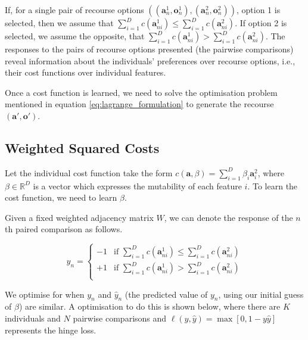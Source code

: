 If, for a single pair of recourse options $((\mathbf{a}_n^1, \mathbf{o}_n^1),(\mathbf{a}_n^2, \mathbf{o}_n^2))$, option 1 is selected, then we assume that $\sum_{i=1}^D c(\mathbf{a}^1_{ni}) \leq \sum_{i=1}^D c(\mathbf{a}^2_{ni})$. If option 2 is selected, we assume the opposite, that $\sum_{i=1}^D c(\mathbf{a}^1_{ni}) > \sum_{i=1}^D c(\mathbf{a}^2_{ni})$. The responses to the pairs of recourse options presented (the pairwise comparisons) reveal information about the individuals' preferences over recourse options, i.e., their cost functions over individual features. 

Once a cost function is learned, we need to solve the optimisation problem mentioned in equation \ref{eq:lagrange_formulation} to generate the recourse $(\mathbf{a}', \mathbf{o}')$.

\subsection{Weighted Squared Costs}

Let the individual cost function take the form $c(\mathbf{a}, \beta) = \sum_{i=1}^D \beta_i \mathbf{a}^2_i$, where $\beta \in \mathbb{R}^D$ is a vector which expresses the mutability of each feature $i$. To learn the cost function, we need to learn $\beta$.

Given a fixed weighted adjacency matrix $W$, we can denote the response of the $n$th paired comparison as follows.

\begin{equation} \label{eq:paired_response}
	y_{n} = \begin{cases}
		-1 & \text{if } \sum_{i=1}^D c(\mathbf{a}^1_{ni}) \leq \sum_{i=1}^D c(\mathbf{a}^2_{ni}) \\
		+1 & \text{if }  \sum_{i=1}^D c(\mathbf{a}^1_{ni}) > \sum_{i=1}^D c(\mathbf{a}^2_{ni}) \\
	\end{cases}
\end{equation}

We optimise for when $y_n$ and $\hat{y}_n$ (the predicted value of $y_n$, using our initial guess of $\beta$) are similar. A optimisation to do this is shown below, where there are $K$ individuals and $N$ pairwise comparisons and $\ell(y, \hat{y}) = \max[0, 1-y\hat{y}]$ represents the hinge loss.


